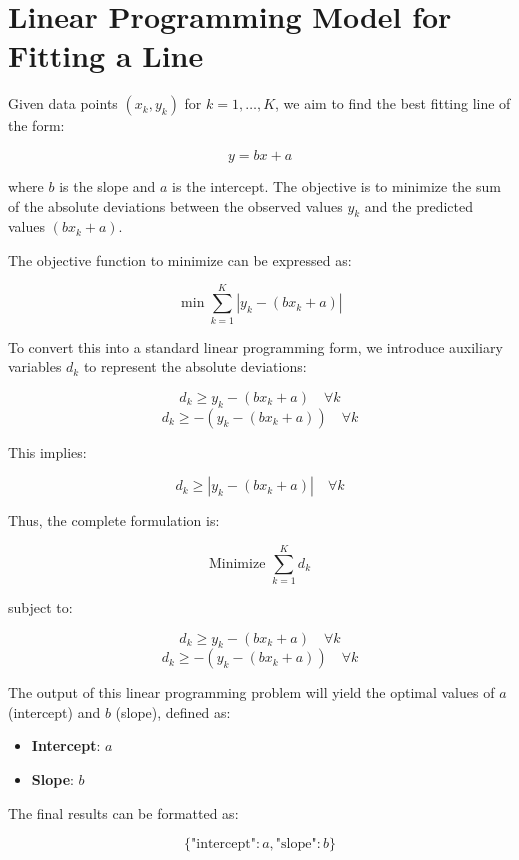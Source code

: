 \documentclass{article}
\begin{document}
\section*{Linear Programming Model for Fitting a Line}

Given data points \((x_k, y_k)\) for \(k = 1, \ldots, K\), we aim to find the best fitting line of the form:

\[
y = bx + a
\]

where \(b\) is the slope and \(a\) is the intercept. The objective is to minimize the sum of the absolute deviations between the observed values \(y_k\) and the predicted values \((bx_k + a)\).

The objective function to minimize can be expressed as:

\[
\min \sum_{k=1}^{K} |y_k - (bx_k + a)|
\]

To convert this into a standard linear programming form, we introduce auxiliary variables \(d_k\) to represent the absolute deviations:

\[
d_k \geq y_k - (bx_k + a) \quad \forall k
\]
\[
d_k \geq -(y_k - (bx_k + a)) \quad \forall k
\]

This implies:

\[
d_k \geq |y_k - (bx_k + a)| \quad \forall k
\]

Thus, the complete formulation is:

\[
\text{Minimize } \sum_{k=1}^{K} d_k
\]

subject to:

\[
d_k \geq y_k - (bx_k + a) \quad \forall k
\]
\[
d_k \geq -(y_k - (bx_k + a)) \quad \forall k
\]

The output of this linear programming problem will yield the optimal values of \(a\) (intercept) and \(b\) (slope), defined as:

\begin{itemize}
    \item \textbf{Intercept}: \(a\)
    \item \textbf{Slope}: \(b\)
\end{itemize}

The final results can be formatted as:

\[
\{\text{"intercept"}: a, \text{"slope"}: b\}
\]
\end{document}
